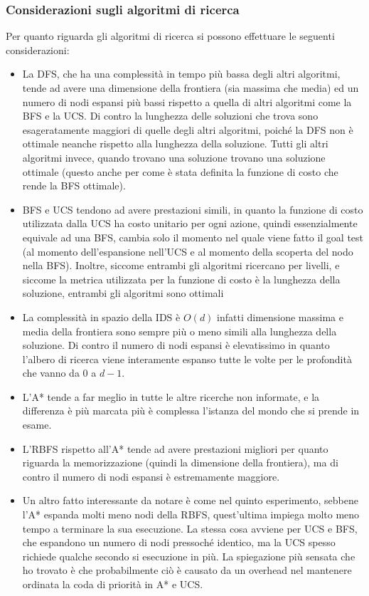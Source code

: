 \documentclass{article}
\begin{document}
	\subsubsection{Considerazioni sugli algoritmi di ricerca}
	Per quanto riguarda gli algoritmi di ricerca si possono effettuare le seguenti considerazioni:
	\begin{itemize}
		\item La DFS, che ha una complessità in tempo più bassa degli altri algoritmi, tende ad avere una dimensione della frontiera (sia massima che media) ed un numero di nodi espansi più bassi rispetto a quella di altri algoritmi come la BFS e la UCS. Di contro la lunghezza delle soluzioni che trova sono esageratamente maggiori di quelle degli altri algoritmi, poiché la DFS non è ottimale neanche rispetto alla lunghezza della soluzione. Tutti gli altri algoritmi invece, quando trovano una soluzione trovano una soluzione ottimale (questo anche per come è stata definita la funzione di costo che rende la BFS ottimale).
		\item BFS e UCS tendono ad avere prestazioni simili, in quanto la funzione di costo utilizzata dalla UCS ha costo unitario per ogni azione, quindi essenzialmente equivale ad una BFS, cambia solo il momento nel quale viene fatto il goal test (al momento dell'espansione nell'UCS e al momento della scoperta del nodo nella BFS). Inoltre, siccome entrambi gli algoritmi ricercano per livelli, e siccome la metrica utilizzata per la funzione di costo è la lunghezza della soluzione, entrambi gli algoritmi sono ottimali
		\item La complessità in spazio della IDS è $O(d)$ infatti dimensione massima e media della frontiera sono sempre più o meno simili alla lunghezza della soluzione. Di contro il numero di nodi espansi è elevatissimo in quanto l'albero di ricerca viene interamente espanso tutte le volte per le profondità che vanno da $0$ a $d-1$.
		\item L'A* tende a far meglio in tutte le altre ricerche non informate, e la differenza è più marcata più è complessa l'istanza del mondo che si prende in esame.
		\item L'RBFS rispetto all'A* tende ad avere prestazioni migliori per quanto riguarda la memorizzazione (quindi la dimensione della frontiera), ma di contro il numero di nodi espansi è estremamente maggiore.
		\item Un altro fatto interessante da notare è come nel quinto esperimento, sebbene l'A* espanda molti meno nodi della RBFS, quest'ultima impiega molto meno tempo a terminare la sua esecuzione. La stessa cosa avviene per UCS e BFS, che espandono un numero di nodi pressoché identico, ma la UCS spesso richiede qualche secondo si esecuzione in più. La spiegazione più sensata che ho trovato è che probabilmente ciò è causato da un overhead nel mantenere ordinata la coda di priorità in A* e UCS.
	\end{itemize}
\end{document}
